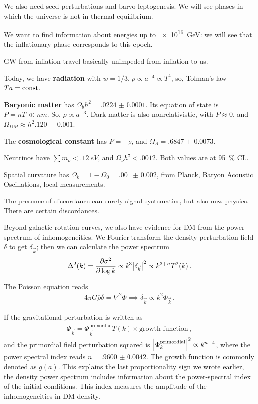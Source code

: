 \documentclass[main.tex]{subfiles}
\begin{document}
We also need seed perturbations and baryo-leptogenesis.
We will see phases in which the universe is not in thermal equilibrium.

We want to find information about energies up to \SI{e16}{GeV}: we will see that the inflationary phase corresponds to this epoch.

GW from inflation travel basically unimpeded from inflation to us. 

Today, we have \textbf{radiation} with \(w = 1/3\), \(\rho \propto a^{-4} \propto T^{4} \), so, Tolman's law \(Ta = \text{const}\). 

\textbf{Baryonic matter} has \(\Omega_b h^2 = \num{.0224(1)}\).
Its equation of state is \(P = nT \ll nm\). So,  \(\rho \propto a^{-3}\). 
Dark matter is also nonrelativistic, with \(P \approx 0\), and \(\Omega_{DM} \approx h^2 \num{.120(1)}\).

The \textbf{cosmological constant} has \(P = - \rho \), and \(\Omega _\Lambda = \num{.6847(73)}\). 

Neutrinos have \(\sum m_\nu < \SI{.12}{eV}\), and \(\Omega _\nu h^2 < \num{.0012}\). Both values are at \SI{95}{\percent} CL. 

Spatial curvature has \(\Omega _k = 1- \Omega_0 = \num{.001(2)}\), from Planck, Baryon Acoustic Oscillations, local measurements.

The presence of discordance can surely signal systematics, but also new physics. There are certain discordances. 

Beyond galactic rotation curves, we also have evidence for DM from the power spectrum of inhomogeneities. 
We Fourier-transform the density perturbation field \(\delta \) to get \(\delta _{\vec{k}}\); then we can calculate the power spectrum 
%
\begin{align}
\Delta^2 (k) = \pdv{ \sigma^2}{\log k} \propto k^3 \abs{ \delta _{\vec{k}}}^2 \propto k^{3+n} T^2 (k)
\,.
\end{align}

The Poisson equation reads 
%
\begin{align}
4 \pi G \overline{\rho} \delta = \nabla^2 \Phi \implies \delta _{\vec{k}} \propto k^2 \Phi_{\vec{k}}
\,.
\end{align}

If the gravitational perturbation is written as 
%
\begin{align}
\Phi _{\vec{k}} = \Phi _{\vec{k}}^{\text{primordial}} T(k) \times \text{growth function}
\,,
\end{align}
%
and the primordial field perturbation squared is \(\abs{\Phi _k^{\text{primordial}}}^2 \propto k^{n-4}\), where the power spectral index reads \(n =\num{.9600(42)}\).
The growth function is commonly denoted as \(g(a)\). 
This explains the last proportionality sign we wrote earlier, the density power spectrum includes information about the power-spectral index of the initial conditions. This index measures the amplitude of the inhomogeneities in DM density. 
\end{document}
